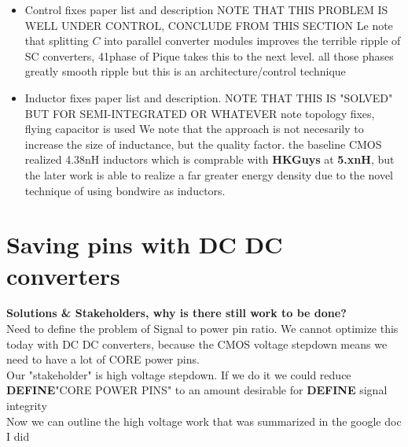 \documentclass[letterpaper,twocolumn,10pt]{article}
\begin{document}
\begin{itemize}
\item{Control fixes paper list and description NOTE THAT THIS PROBLEM IS WELL UNDER CONTROL, CONCLUDE FROM THIS SECTION} Le note that splitting $C$ into parallel converter modules improves the terrible ripple of SC converters, 41phase of Pique takes this to the next level. all those phases greatly smooth ripple but this is an architecture/control technique
\item{Inductor fixes paper list and description. NOTE THAT THIS IS "SOLVED" BUT FOR SEMI-INTEGRATED OR WHATEVER note topology fixes, flying capacitor is used}
We note that the approach is not necesarily to increase the size of inductance, but the quality factor. the baseline CMOS \cite{Alimadadi2008} realized 4.38nH inductors which is comprable with \textbf{HKGuys} at \textbf{5.xnH}, but the later work is able to realize a far greater energy density due to the novel technique of using bondwire as inductors.
\end{itemize}

\section{Saving pins with DC DC converters}

\textbf{Solutions \& Stakeholders, why is there still work to be done?}\\
Need to define the problem of Signal to power pin ratio. We cannot optimize this today with DC DC converters, because the \@ CMOS voltage stepdown means we need to have a lot of CORE power pins.\\
Our "stakeholder" is high voltage stepdown. If we do it we could reduce \textbf{DEFINE}"CORE POWER PINS" to an amount desirable for \textbf{DEFINE} signal integrity\\
Now we can outline the high voltage work that was summarized in the google doc I did
\end{document}
